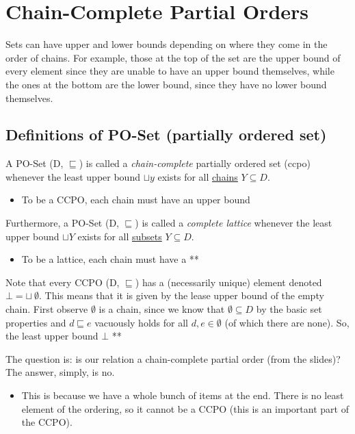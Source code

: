 \documentclass[11pt,a4paper,titlepage,dvipsnames,cmyk]{scrartcl}
\begin{document}
\section{Chain-Complete Partial Orders}%
\label{sec:ccpo}

Sets can have upper and lower bounds depending on where they come in the
order of chains. For example, those at the top of the set are the upper
bound of every element since they are unable to have an upper bound
themselves, while the ones at the bottom are the lower bound, since they
have no lower bound themselves.

\subsection{Definitions of PO-Set (partially ordered set)}%
\label{sub:Definitions of PO-Set}
A PO-Set (D, $\sqsubseteq$) is called a \textit{chain-complete} partially
ordered set (ccpo) whenever the least upper bound $\sqcup y$ exists for
all \underline{chains} $Y \subseteq D$.
\begin{itemize}
    \item To be a CCPO, each chain must have an upper bound
\end{itemize}

Furthermore, a PO-Set (D, $\sqsubseteq$) is called a \textit{complete
lattice} whenever the least upper bound $\sqcup Y$ exists for all
\underline{subsets} $Y\subseteq D$.
\begin{itemize}
    \item To be a lattice, each chain must have a ** %
\end{itemize}

Note that every CCPO (D, $\sqsubseteq$) has a (necessarily unique) element
denoted $\bot = \sqcup \ \emptyset$. This means that it is given by the
lease upper bound of the empty chain. First observe $\emptyset$ is a
chain, since we know that $\emptyset \subseteq D$ by the basic set
properties and $d \sqsubseteq e$ vacuously holds for all $d,e \in
\emptyset$ (of which there are none). So, the least upper bound $\bot$ **

The question is: is our relation a chain-complete partial order (from the
slides)? The answer, simply, is no.
\begin{itemize}
    \item This is because we have a whole bunch of items at the end. There
        is no least element of the ordering, so it cannot be a CCPO (this
        is an important part of the CCPO).
\end{itemize}
\end{document}
